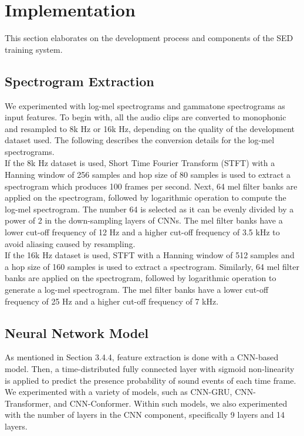 \linespread{1.3}
\chapter{Implementation}
This section elaborates on the development process and components of the SED training system.


\section{Spectrogram Extraction}
We experimented with log-mel spectrograms and gammatone spectrograms as input features. To begin with, all the audio clips are converted to monophonic and resampled to 8k Hz or 16k Hz, depending on the quality of the development dataset used. The following describes the conversion details for the log-mel spectrograms.\\ 

If the 8k Hz dataset is used, Short Time Fourier Transform (STFT) with a Hanning window of 256 samples and hop size of  80 samples is used to extract a spectrogram which produces 100 frames per second. Next, 64 mel filter banks are applied on the spectrogram, followed by logarithmic operation to compute the log-mel spectrogram. The number 64 is selected as it can be evenly divided by a power of 2 in the down-sampling layers of CNNs. The mel filter banks have a lower cut-off frequency of 12 Hz and a higher cut-off frequency of 3.5 kHz to avoid aliasing caused by resampling.\\

If the 16k Hz dataset is used, STFT with a Hanning window of 512 samples and a hop size of 160 samples is used to extract a spectrogram. Similarly, 64 mel filter banks are applied on the spectrogram, followed by logarithmic operation to generate a log-mel spectrogram. The mel filter banks have a lower cut-off frequency of 25 Hz and a higher cut-off frequency of 7 kHz.
\

\section{Neural Network Model}
As mentioned in Section 3.4.4, feature extraction is done with a CNN-based model. Then, a time-distributed fully connected layer with sigmoid non-linearity is applied to predict the presence probability of sound events of each time frame. We experimented with a variety of models, such as CNN-GRU, CNN-Transformer, and CNN-Conformer. Within such models, we also experimented with the number of layers in the CNN component, specifically 9 layers and 14 layers. 


